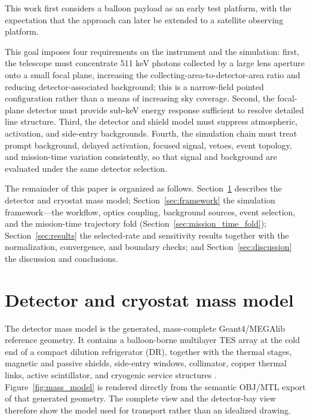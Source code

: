\documentclass[11pt]{article}
\begin{document}
This work first considers a balloon payload as an early test platform, with the expectation that the approach can later be extended to a satellite observing platform.

This goal imposes four requirements on the instrument and the simulation: first, the telescope must concentrate 511 keV photons collected by a large lens aperture onto a small focal plane, increasing the collecting-area-to-detector-area ratio and reducing detector-associated background; this is a narrow-field pointed configuration rather than a means of increasing sky coverage. Second, the focal-plane detector must provide sub-keV energy response sufficient to resolve detailed line structure. Third, the detector and shield model must suppress atmospheric, activation, and side-entry backgrounds. Fourth, the simulation chain must treat prompt background, delayed activation, focused signal, vetoes, event topology, and mission-time variation consistently, so that signal and background are evaluated under the same detector selection.

The remainder of this paper is organized as follows. Section~\ref{sec:geometry} describes the detector and cryostat mass model; Section~\ref{sec:framework} the simulation framework---the workflow, optics coupling, background sources, event selection, and the mission-time trajectory fold (Section~\ref{sec:mission_time_fold}); Section~\ref{sec:results} the selected-rate and sensitivity results together with the normalization, convergence, and boundary checks; and Section~\ref{sec:discussion} the discussion and conclusions.

\section{Detector and cryostat mass model}
\label{sec:geometry}

The detector mass model is the generated, mass-complete Geant4/MEGAlib
reference geometry. It contains a balloon-borne multilayer TES array at the cold end of a
compact dilution refrigerator (DR), together with the thermal stages, magnetic
and passive shields, side-entry windows, collimator, copper thermal links,
active scintillator, and cryogenic service structures
\cite{Shirazi2023,Gottardi2021TESReview}. Figure~\ref{fig:mass_model} is rendered
directly from the semantic OBJ/MTL export of that generated geometry. The complete
view and the detector-bay view therefore show the model used for transport rather
than an idealized drawing.
\end{document}
